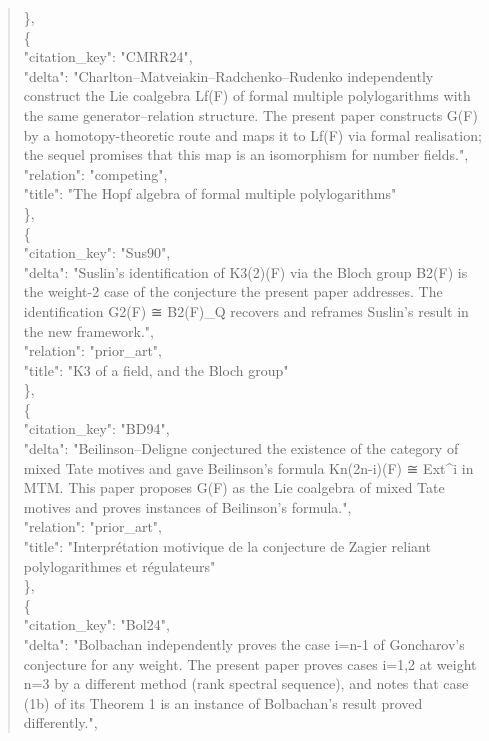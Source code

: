 \documentclass[11pt]{article}
\begin{document}
\begin{quote}
    \},\\
    \{\\
      "citation\_key": "CMRR24",\\
      "delta": "Charlton--Matveiakin--Radchenko--Rudenko independently construct the Lie coalgebra Lf(F) of formal multiple polylogarithms with the same generator--relation structure. The present paper constructs G(F) by a homotopy-theoretic route and maps it to Lf(F) via formal realisation; the sequel promises that this map is an isomorphism for number fields.",\\
      "relation": "competing",\\
      "title": "The Hopf algebra of formal multiple polylogarithms"\\
    \},\\
    \{\\
      "citation\_key": "Sus90",\\
      "delta": "Suslin's identification of K3(2)(F) via the Bloch group B2(F) is the weight-2 case of the conjecture the present paper addresses. The identification G2(F) ≅ B2(F)\_Q recovers and reframes Suslin's result in the new framework.",\\
      "relation": "prior\_art",\\
      "title": "K3 of a field, and the Bloch group"\\
    \},\\
    \{\\
      "citation\_key": "BD94",\\
      "delta": "Beilinson--Deligne conjectured the existence of the category of mixed Tate motives and gave Beilinson's formula Kn(2n-i)(F) ≅ Ext\^{}i in MTM. This paper proposes G(F) as the Lie coalgebra of mixed Tate motives and proves instances of Beilinson's formula.",\\
      "relation": "prior\_art",\\
      "title": "Interprétation motivique de la conjecture de Zagier reliant polylogarithmes et régulateurs"\\
    \},\\
    \{\\
      "citation\_key": "Bol24",\\
      "delta": "Bolbachan independently proves the case i=n-1 of Goncharov's conjecture for any weight. The present paper proves cases i=1,2 at weight n=3 by a different method (rank spectral sequence), and notes that case (1b) of its Theorem 1 is an instance of Bolbachan's result proved differently.",\\

\end{quote}
\end{document}

